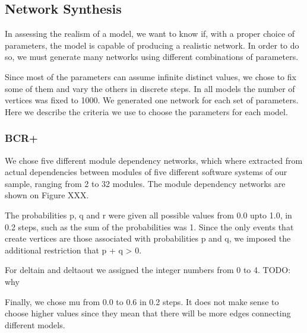 

\subsection{Network Synthesis}

In assessing the realism of a model, we want to know if, with a proper choice of
parameters, the model is capable of producing a realistic network. In order to
do so, we must generate many networks using different combinations of
parameters. 

Since most of the parameters can assume infinite distinct values, we chose to
fix some of them and vary the others in discrete steps. In all models the number
of vertices was fixed to 1000. We generated one network for each set of
parameters. Here we describe the criteria we use to choose the parameters for
each model.

\subsubsection{BCR+}

We chose five different module dependency networks, which where extracted from
actual dependencies between modules of five different software systems of our
sample, ranging from 2 to 32 modules. The module dependency networks are shown
on Figure XXX. 

The probabilities p, q and r were given all possible values from 0.0 upto 1.0,
in 0.2 steps, such as the sum of the probabilities was 1. Since the only events
that create vertices are those associated with probabilities p and q, we imposed
the additional restriction that p + q > 0.

For deltain and deltaout we assigned the integer numbers from 0 to 4. TODO: why

Finally, we chose mu from 0.0 to 0.6 in 0.2 steps. It does not make sense to
choose higher values since they mean that there will be more edges connecting
different models.

